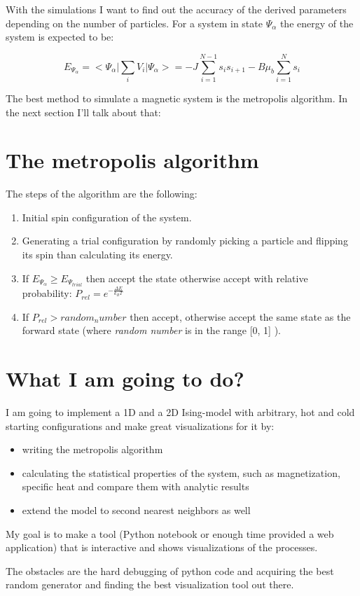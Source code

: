 \documentclass[a4paper,12pt]{article}
\begin{document}
\par With the simulations I want to find out the accuracy of the 
derived parameters depending on the number of particles. For a 
system in state $\Psi_{\alpha}$ the energy of the system is expected
to be:

\begin{equation*}
    E_{\Psi_{\alpha}} = \Big<\Psi_{\alpha}\Big|\sum_{i}V_{i}\Big|\Psi_{\alpha}\Big> = -J\sum_{i=1}^{N-1}s_{i}s_{i+1} - B\mu_{b}\sum_{i=1}^{N}s_{i}
\end{equation*}

\par The best method to simulate a magnetic system is the metropolis algorithm.
In the next section I'll talk about that:

\section{The metropolis algorithm}

\par The steps of the algorithm are the following:

\begin{enumerate}
    \item Initial spin configuration of the system.
    \item Generating a trial configuration by randomly picking a particle and flipping its spin
    than calculating its energy.
    \item If $E_{\Psi_{\alpha}} \geq E_{\Psi_{trial}}$ then accept the state
    otherwise accept with relative probability: $P_{rel} = e^{-\frac{\Delta E}{k_{B}T}}$
    \item If $P_{rel} > random_number$ then accept, otherwise accept the same state as the
    forward state (where \textit{random number} is in the range [0, 1] ).
\end{enumerate}

\section{What I am going to do?}

\par I am going to implement a 1D and a 2D Ising-model with arbitrary, hot and cold 
starting configurations and make great visualizations for it by:

\begin{itemize}
    \item writing the metropolis algorithm
    \item calculating the statistical properties of the system, such
    as magnetization, specific heat and compare them with analytic results
    \item extend the model to second nearest neighbors as well
\end{itemize}

\par My goal is to make a tool (Python notebook or enough time provided 
a web application) that is interactive and shows visualizations of the processes.

\par The obstacles are the hard debugging of python code and acquiring the 
best random generator and finding the best visualization tool out there.
\end{document}
